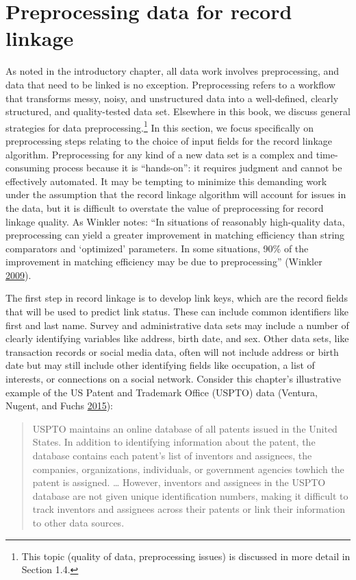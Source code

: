 \documentclass[]{krantz}
\begin{document}
\section{Preprocessing data for record
linkage}\label{preprocessing-data-for-record-linkage}

As noted in the introductory chapter, all data work involves
preprocessing, and data that need to be linked is no exception.
Preprocessing refers to a workflow that transforms messy, noisy, and
unstructured data into a well-defined, clearly structured, and
quality-tested data set. Elsewhere in this book, we discuss general
strategies for data preprocessing.\footnote{This topic (quality of data,
  preprocessing issues) is discussed in more detail in Section 1.4.} In
this section, we focus specifically on preprocessing steps relating to
the choice of input fields for the record linkage algorithm.
Preprocessing for any kind of a new data set is a complex and
time-consuming process because it is ``hands-on'': it requires judgment
and cannot be effectively automated. It may be tempting to minimize this
demanding work under the assumption that the record linkage algorithm
will account for issues in the data, but it is difficult to overstate
the value of preprocessing for record linkage quality. As Winkler notes:
``In situations of reasonably high-quality data, preprocessing can yield
a greater improvement in matching efficiency than string comparators and
`optimized' parameters. In some situations, 90\% of the improvement in
matching efficiency may be due to preprocessing'' (Winkler
\protect\hyperlink{ref-winkler09}{2009}).

The first step in record linkage is to develop link keys, which are the
record fields that will be used to predict link status. These can
include common identifiers like first and last name. Survey and
administrative data sets may include a number of clearly identifying
variables like address, birth date, and sex. Other data sets, like
transaction records or social media data, often will not include address
or birth date but may still include other identifying fields like
occupation, a list of interests, or connections on a social network.
Consider this chapter's illustrative example of the US Patent and
Trademark Office (USPTO) data (Ventura, Nugent, and Fuchs
\protect\hyperlink{ref-ventura2015seeing}{2015}):

\begin{quote}
USPTO maintains an online database of all patents issued in the United
States. In addition to identifying information about the patent, the
database contains each patent's list of inventors and assignees, the
companies, organizations, individuals, or government agencies towhich
the patent is assigned. \ldots{} However, inventors and assignees in the
USPTO database are not given unique identification numbers, making it
difficult to track inventors and assignees across their patents or link
their information to other data sources.
\end{quote}
\end{document}
